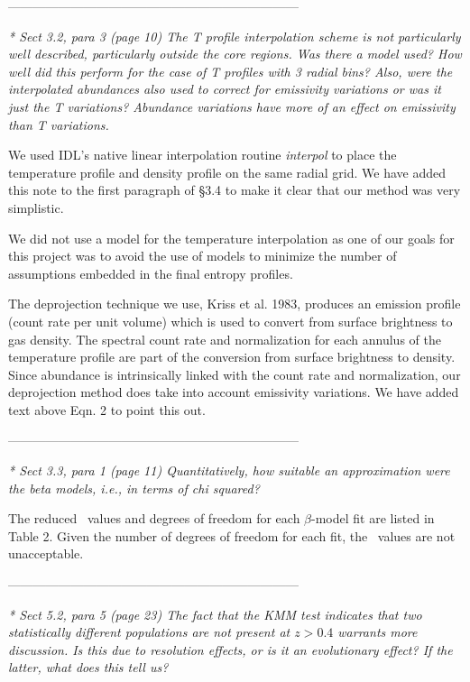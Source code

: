 \documentclass[11pt]{article}
\begin{document}
---------------------------------------------------------------------

{\it{* Sect 3.2, para 3 (page 10) The T profile interpolation scheme
    is not particularly well described, particularly outside the core
    regions. Was there a model used? How well did this perform for the
    case of T profiles with 3 radial bins? Also, were the interpolated
    abundances also used to correct for emissivity variations or was
    it just the T variations? Abundance variations have more of an
    effect on emissivity than T variations.}}

We used IDL's native linear interpolation routine {\it{interpol}} to
place the temperature profile and density profile on the same radial
grid. We have added this note to the first paragraph of \S 3.4 to make
it clear that our method was very simplistic.

We did not use a model for the temperature interpolation as one of our
goals for this project was to avoid the use of models to minimize the
number of assumptions embedded in the final entropy profiles.

The deprojection technique we use, Kriss et al. 1983, produces an
emission profile (count rate per unit volume) which is used to convert
from surface brightness to gas density. The spectral count rate and
normalization for each annulus of the temperature profile are part of
the conversion from surface brightness to density. Since abundance is
intrinsically linked with the count rate and normalization, our
deprojection method does take into account emissivity variations. We
have added text above Eqn. 2 to point this out.

---------------------------------------------------------------------

{\it{* Sect 3.3, para 1 (page 11) Quantitatively, how suitable an
    approximation were the beta models, i.e., in terms of chi
    squared?}}

The reduced \chisq\ values and degrees of freedom for each
$\beta$-model fit are listed in Table 2. Given the number of degrees
of freedom for each fit, the \chisq\ values are not unacceptable.

---------------------------------------------------------------------

{\it{* Sect 5.2, para 5 (page 23) The fact that the KMM test indicates
    that two statistically different populations are not present at
    $z>0.4$ warrants more discussion. Is this due to resolution effects,
    or is it an evolutionary effect? If the latter, what does this
    tell us?}}
\end{document}

